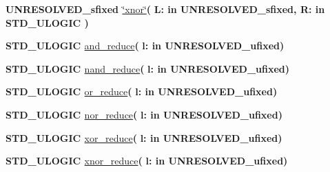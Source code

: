 \begin{DoxyCompactItemize}
\item 
{\bfseries {\bfseries \textcolor{vhdlchar}{U\+N\+R\+E\+S\+O\+L\+V\+E\+D\+\_\+sfixed}\textcolor{vhdlchar}{ }}} \hyperlink{class__fixed__pkg_ad2d3fa25b28fee177997bfb173f92fea}{\char`\"{}xnor\char`\"{}}{\bfseries  ( }{\bfseries \textcolor{vhdlchar}{L\+: }\textcolor{stringliteral}{in }\textcolor{vhdlchar}{U\+N\+R\+E\+S\+O\+L\+V\+E\+D\+\_\+sfixed}}{\bfseries  , \textcolor{vhdlchar}{R\+: }\textcolor{stringliteral}{in }{\bfseries \textcolor{comment}{S\+T\+D\+\_\+\+U\+L\+O\+G\+I\+C}\textcolor{vhdlchar}{ }}}{\bfseries  )} 
\item 
{\bfseries {\bfseries \textcolor{comment}{S\+T\+D\+\_\+\+U\+L\+O\+G\+I\+C}\textcolor{vhdlchar}{ }}} \hyperlink{class__fixed__pkg_ab127ad18d0e5b9a38b09dfeeb23f2809}{and\+\_\+reduce}{\bfseries  ( }{\bfseries \textcolor{vhdlchar}{l\+: }\textcolor{stringliteral}{in }\textcolor{vhdlchar}{U\+N\+R\+E\+S\+O\+L\+V\+E\+D\+\_\+ufixed}}{\bfseries  )} 
\item 
{\bfseries {\bfseries \textcolor{comment}{S\+T\+D\+\_\+\+U\+L\+O\+G\+I\+C}\textcolor{vhdlchar}{ }}} \hyperlink{class__fixed__pkg_adce82fa7ec9d1f061f5d6b3dc67d583d}{nand\+\_\+reduce}{\bfseries  ( }{\bfseries \textcolor{vhdlchar}{l\+: }\textcolor{stringliteral}{in }\textcolor{vhdlchar}{U\+N\+R\+E\+S\+O\+L\+V\+E\+D\+\_\+ufixed}}{\bfseries  )} 
\item 
{\bfseries {\bfseries \textcolor{comment}{S\+T\+D\+\_\+\+U\+L\+O\+G\+I\+C}\textcolor{vhdlchar}{ }}} \hyperlink{class__fixed__pkg_adee70e282d92bddd3959ca7436fdfb87}{or\+\_\+reduce}{\bfseries  ( }{\bfseries \textcolor{vhdlchar}{l\+: }\textcolor{stringliteral}{in }\textcolor{vhdlchar}{U\+N\+R\+E\+S\+O\+L\+V\+E\+D\+\_\+ufixed}}{\bfseries  )} 
\item 
{\bfseries {\bfseries \textcolor{comment}{S\+T\+D\+\_\+\+U\+L\+O\+G\+I\+C}\textcolor{vhdlchar}{ }}} \hyperlink{class__fixed__pkg_a807bcfdd90aa99257feb3c93cb068e79}{nor\+\_\+reduce}{\bfseries  ( }{\bfseries \textcolor{vhdlchar}{l\+: }\textcolor{stringliteral}{in }\textcolor{vhdlchar}{U\+N\+R\+E\+S\+O\+L\+V\+E\+D\+\_\+ufixed}}{\bfseries  )} 
\item 
{\bfseries {\bfseries \textcolor{comment}{S\+T\+D\+\_\+\+U\+L\+O\+G\+I\+C}\textcolor{vhdlchar}{ }}} \hyperlink{class__fixed__pkg_a89bc2be1fa542184cf07e7c65187b945}{xor\+\_\+reduce}{\bfseries  ( }{\bfseries \textcolor{vhdlchar}{l\+: }\textcolor{stringliteral}{in }\textcolor{vhdlchar}{U\+N\+R\+E\+S\+O\+L\+V\+E\+D\+\_\+ufixed}}{\bfseries  )} 
\item 
{\bfseries {\bfseries \textcolor{comment}{S\+T\+D\+\_\+\+U\+L\+O\+G\+I\+C}\textcolor{vhdlchar}{ }}} \hyperlink{class__fixed__pkg_ab6ceee79204a420850ad9e7876dc0ec4}{xnor\+\_\+reduce}{\bfseries  ( }{\bfseries \textcolor{vhdlchar}{l\+: }\textcolor{stringliteral}{in }\textcolor{vhdlchar}{U\+N\+R\+E\+S\+O\+L\+V\+E\+D\+\_\+ufixed}}{\bfseries  )} 

\end{DoxyCompactItemize}
